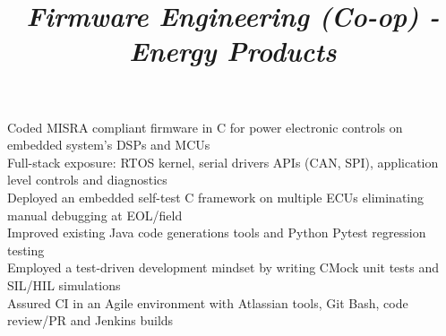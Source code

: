 \documentclass[mm]{res}
\begin{document}
\begin{resume}
\title{\textsl{Firmware Engineering (Co-op) - Energy Products}}
\begin{position}
\tb Coded MISRA compliant firmware in C for power electronic controls on embedded system's DSPs and MCUs\\
\tb Full-stack exposure: RTOS kernel, serial drivers APIs (CAN, SPI), application level controls and diagnostics\\
\tb Deployed an embedded self-test C framework on multiple ECUs eliminating manual debugging at EOL/field\\
\tb Improved existing Java code generations tools and Python Pytest regression testing\\
\tb Employed a test-driven development mindset by writing CMock unit tests and SIL/HIL simulations \\
\tb Assured CI in an Agile environment with Atlassian tools, Git Bash, code review/PR and Jenkins builds
\end{position}


\end{resume}
\end{document}
